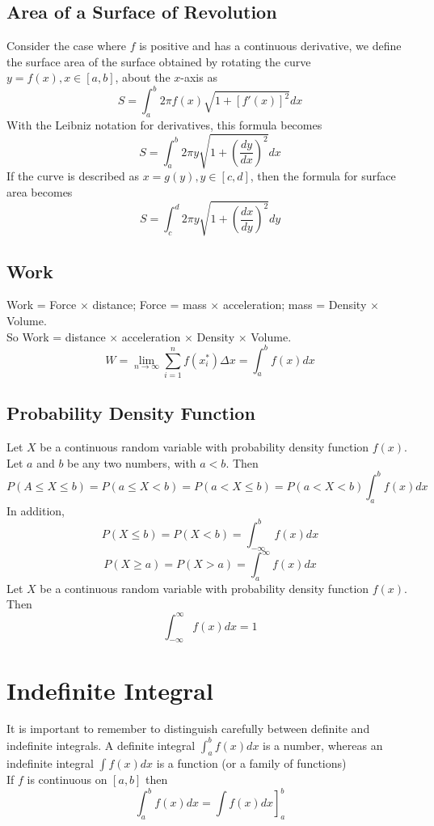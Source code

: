 \documentclass[10pt]{report}
\begin{document}
\subsection{Area of a Surface of Revolution}
Consider the case where $f$ is positive and has a continuous derivative, we define the surface area of the surface obtained by rotating the curve $y=f(x), x\in [a,b]$, about the $x$-axis as
$$S = \int_a^b 2\pi f(x) \sqrt{ 1 + [f'(x)]^2}dx$$
With the Leibniz notation for derivatives, this formula becomes
$$S=\int_a^b 2\pi y\sqrt{1+\left(\frac{dy}{dx}\right)^2}dx$$
If the curve is described as $x=g(y),y\in [c,d]$, then the formula for surface area becomes
$$S=\int_c^d 2\pi y\sqrt{1+\left(\frac{dx}{dy}\right)^2}dy$$

\subsection{Work}
Work = Force $\times$ distance; Force = mass $\times$ acceleration; mass = Density $\times$ Volume.\\
So Work = distance $\times$ acceleration $\times$ Density $\times$ Volume.
$$W = \lim_{n\to\infty}\sum_{i=1}^n f(x_i^*)\Delta x = \int_a^b f(x)dx$$

\subsection{Probability Density Function}
Let $X$ be a continuous random variable with probability density function $f(x)$. Let $a$ and $b$ be any two numbers, with $a<b$. Then
$$P(A\leq X \leq b) = P(a\leq X < b) = P(a < X \leq b) = P(a<X<b) \int_a^b f(x)dx$$
In addition, 
$$P(X\leq b) = P(X<b) = \int_{-\infty}^bf(x)dx$$
$$P(X\geq a) = P(X>a) = \int_a^\infty f(x)dx$$
Let $X$ be a continuous random variable with probability density function $f(x)$. Then
$$\int_{-\infty}^\infty f(x)dx = 1$$

\section{Indefinite Integral}
It is important to remember to distinguish carefully between definite and indefinite integrals. A definite integral $\int_a^bf(x)dx$ is a number, whereas an indefinite integral $\int f(x)dx$ is a function (or a family of functions)\\
If $f$ is continuous on $[a,b]$ then
$$\int_a^b f(x)dx=\left.\int f(x)dx\right]_a^b$$
\end{document}
